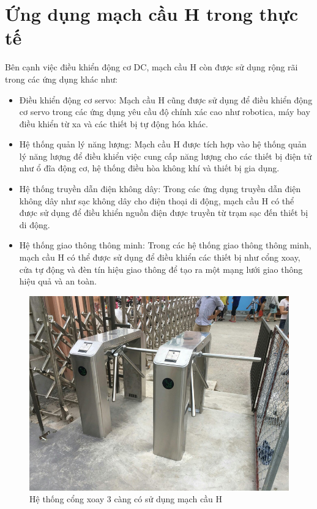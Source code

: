     \section{Ứng dụng mạch cầu H trong thực tế}
        Bên cạnh việc điều khiển động cơ DC, mạch cầu H còn được sử dụng rộng rãi trong các ứng dụng khác như:
        \begin{itemize}
            \item Điều khiển động cơ servo: Mạch cầu H cũng được sử dụng để điều khiển động cơ servo trong các ứng dụng yêu cầu độ chính xác cao như robotica, máy bay điều khiển từ xa và các thiết bị tự động hóa khác.
            \item Hệ thống quản lý năng lượng: Mạch cầu H được tích hợp vào hệ thống quản lý năng lượng để điều khiển việc cung cấp năng lượng cho các thiết bị điện tử như ổ đĩa động cơ, hệ thống điều hòa không khí và thiết bị gia dụng.
            \item Hệ thống truyền dẫn điện không dây: Trong các ứng dụng truyền dẫn điện không dây như sạc không dây cho điện thoại di động, mạch cầu H có thể được sử dụng để điều khiển nguồn điện được truyền từ trạm sạc đến thiết bị di động.
            \item Hệ thống giao thông thông minh: Trong các hệ thống giao thông thông minh, mạch cầu H có thể được sử dụng để điều khiển các thiết bị như cổng xoay, cửa tự động và đèn tín hiệu giao thông để tạo ra một mạng lưới giao thông hiệu quả và an toàn.
        \end{itemize}
        \begin{figure}[H]
            \centering
            \includegraphics[width=1\textwidth]{pictures/cong3que.png}
            \caption{Hệ thống cổng xoay 3 càng có sử dụng mạch cầu H}
            \label{fig:hbridge}
        \end{figure}
        \cleardoublepage